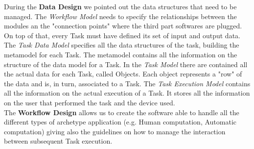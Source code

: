 During the \textbf{Data Design} we pointed out the data structures that
need to be managed. The \emph{Workflow Model} needs to specify the relationships
between the modules an the "connection points" where the third part softwares
are plugged. On top of that, every Task must have defined its set of input and
output data.
The \emph{Task Data Model} specifies all the data structures of the task, building
the metamodel for each Task. The metamodel contains all the information on the 
structure of the data model for a Task.
In the \emph{Task Model} there are contained all the actual data for each Task, called
Objects. Each object represents a "row" of the data and is, in turn,
associated to a Task.
The \emph{Task Execution Model} contains all the information on the actual
execution of a Task. It stores all the information on the user that performed the task and
the device used.\\

The \textbf{Workflow Design} allows us to create the software able to handle all
the different types of archetype application (e.g. Human computation, Automatic
computation) giving also the guidelines on how to manage the interaction between
subsequent Task execution.